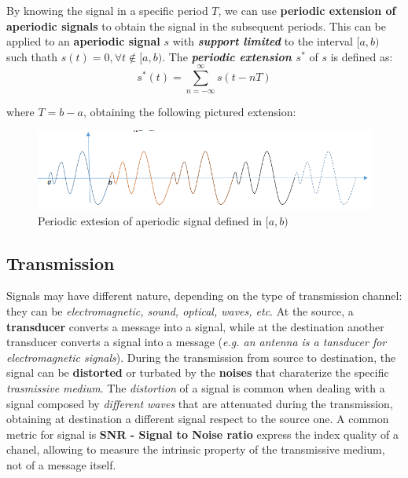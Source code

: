 \documentclass[10pt,a4paper]{report}
\theoremstyle{definition}
\begin{document}
By knowing the signal in a specific period $T$, we can use \textbf{periodic extension of aperiodic signals} to obtain the signal in the subsequent periods.  This can be applied to an \textbf{aperiodic signal} $s$ with \textit{\textbf{support limited}} to the interval $[a,b)$ such thath $s(t) = 0, \forall t \notin [a,b)$. The \textit{\textbf{periodic extension $s^{*}$}} of $s$ is defined as:
\begin{equation}
s^{*}(t) = \sum^{\infty}_{n=-\infty}s(t-nT)
\end{equation}

where $T = b-a$, obtaining the following pictured extension:
\begin{figure}[h]
	\centering\includegraphics[scale=0.50]{images/Pasted image 20230505115013.png}
	\caption{Periodic extesion of aperiodic signal defined in $[a,b)$}
	\label{periodic-extension-diagram}
\end{figure}

\subsection{Transmission}\label{sec:transmission}
Signals may have different nature, depending on the type of transmission channel: they can be \textit{electromagnetic, sound, optical, waves, etc}.
At the source, a \textbf{transducer} converts a message into a signal, while at the destination another transducer converts a signal into a message (\textit{e.g. an antenna is a tansducer for electromagnetic signals}).
During the transmission from source to destination, the signal can be \textbf{distorted} or turbated by the \textbf{noises} that charaterize the specific \textit{trasmissive medium}. The \textit{distortion} of a signal is common when dealing with a signal composed by \textit{different waves} that are attenuated during the transmission, obtaining at destination a different signal respect to the source one.
A common metric for signal is \textbf{SNR - Signal to Noise ratio} express the index quality of a chanel, allowing to measure the intrinsic property of the transmissive medium, not of a message itself.
\end{document}
